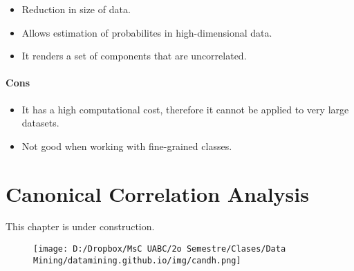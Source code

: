 \documentclass[]{book}
\providecommand{\tightlist}{%
  \setlength{\itemsep}{0pt}\setlength{\parskip}{0pt}}
\begin{document}
\begin{itemize}
\tightlist
\item
  Reduction in size of data.
\item
  Allows estimation of probabilites in high-dimensional data.
\item
  It renders a set of components that are uncorrelated.
\end{itemize}

\subsubsection{\texorpdfstring{\textbf{Cons}}{Cons}}\label{cons}

\begin{itemize}
\tightlist
\item
  It has a high computational cost, therefore it cannot be applied to
  very large datasets.
\item
  Not good when working with fine-grained classes.
\end{itemize}

\chapter{Canonical Correlation
Analysis}\label{canonical-correlation-analysis}

This chapter is under construction.

\begin{figure}[htbp]
\centering
\texttt{[image: D:/Dropbox/MsC UABC/2o Semestre/Clases/Data Mining/datamining.github.io/img/candh.png]}
\caption{}
\end{figure}


\end{document}
